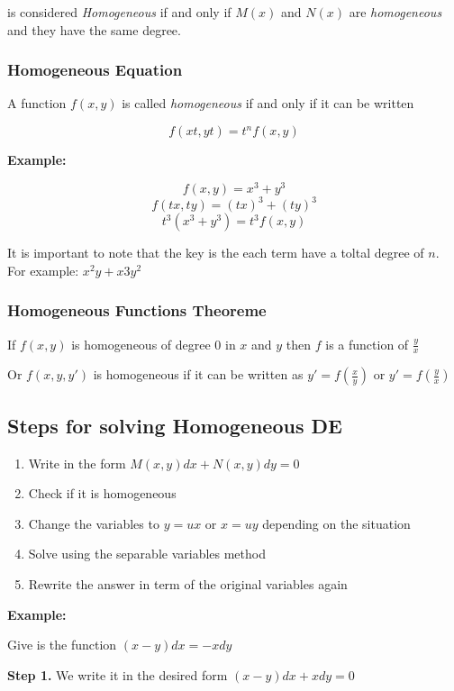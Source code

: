 is considered \emph{Homogeneous} if and only if
\(M(x)\) and \(N(x)\) are \emph{homogeneous} and they have the same degree.

\subsubsection{Homogeneous Equation}

A function \(f(x,y)\) is called \emph{homogeneous} if and only if it can be written

\[f(xt, yt) = t^n f(x,y)\]

\textbf{Example: }

\[f(x,y) = x^3 + y^3\]
\[f(tx, ty) = (tx)^3 + (ty)^3\]
\[t^3 (x^3 + y^3) = t^3 f(x,y)\]

It is important to note that the key is the each term have a toltal degree of \(n\).
For example: \(x^2y + x3y^2\)

\subsubsection{Homogeneous Functions Theoreme}

If \(f(x,y)\) is homogeneous of degree \(0\) in \(x\) and \(y\) then 
\(f\) is a function of \(\frac{y}{x}\)

Or \(f(x,y,y')\) is homogeneous if it can be written as \(y' = f(\frac{x}{y})\) or \(y' = f(\frac{y}{x})\)

\subsection{Steps for solving Homogeneous DE}

\begin{enumerate}
    \item Write in the form \(M(x,y)dx + N(x,y)dy = 0\)
    \item Check if it is homogeneous
    \item Change the variables to \(y = ux\) or \(x = uy\) depending on the situation
    \item Solve using the separable variables method
    \item Rewrite the answer in term of the original variables again
\end{enumerate}

\textbf{Example:}

Give is the function \((x -y)dx = - xdy\)

\textbf{Step 1.} We write it in the desired form \((x - y)dx + xdy = 0\)

